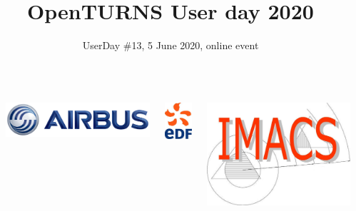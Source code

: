 \documentclass{beamer}
\title[OpenTURNS]{OpenTURNS User day 2020}
\date[]{UserDay \#13, 5 June 2020, online event}
\begin{document}

  \begin{frame}
  \titlepage

  \begin{columns}
  \begin{column}[t]{0.05\textwidth}
        \end{column}
  
  \begin{center}
\includegraphics[height=0.04\textheight]{figures/airbus-logo-3d-blue.png}
\end{center}

  \begin{center}
\includegraphics[height=0.09\textheight]{figures/logo-edf.jpg}
\end{center}

  \begin{center}
\includegraphics[height=0.09\textheight]{figures/imacs-logo.jpg}
\end{center}


\end{columns}
\end{frame}
\end{document}
